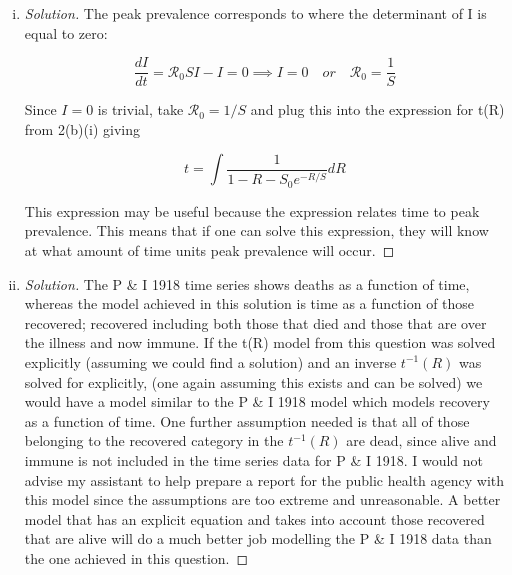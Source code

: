 \documentclass[12pt]{article}
\begin{document}
\begin{enumerate}[(a)]
\begin{enumerate}[(i)]
{\begin{proof}[Solution]
\end{proof}
}

 \item \basicSIRanalQbii

{\color{blue}
\begin{proof}[Solution]
	The peak prevalence corresponds to where the determinant of I is equal to zero:
	
	\begin{equation}
	\frac{dI}{dt}=\mathcal{R}_0 SI-I=0 \implies I=0 \quad or \quad  \mathcal{R}_0=\frac{1}{S}
	\end{equation}
	
	Since $I=0$ is trivial, take $\mathcal{R}_0=1/S$ and plug this into the expression for t(R) from 2(b)(i) giving 
	
	\begin{equation}
	t=\int \frac{1}{1-R-S_0e^{-R/S}}dR
	\end{equation}

	This expression may be useful because the expression relates time to peak prevalence. This means that if one can solve this expression, they will know at what amount of time units peak prevalence will occur.

\end{proof}
}

  \item \basicSIRanalQbiii
  
{\color{blue}
\begin{proof}[Solution]

	The P \& I 1918 time series shows deaths as a function of time, whereas the model achieved in this solution is time as a function of those recovered; recovered including both those that died and those that are over the illness and now immune. If the t(R) model from this question was solved explicitly (assuming we could find a solution) and an inverse $t^{-1}(R)$ was solved for explicitly, (one again assuming this exists and can be solved) we would have a model similar to the P \& I 1918 model which models recovery as a function of time. One further assumption needed is that all of those belonging to the recovered category in the $t^{-1}(R)$ are dead, since alive and immune is not included in the time series data for P \& I 1918. I would not advise my assistant to help prepare a report for the public health agency with this model since the assumptions are too extreme and unreasonable. A better model that has an explicit equation and takes into account those recovered that are alive will do a much better job modelling the P \& I 1918 data than the one achieved in this question.


\end{proof}}
\end{enumerate}
\end{enumerate}
\end{document}
